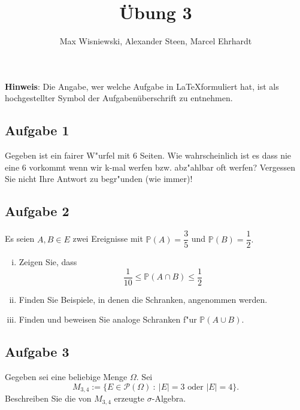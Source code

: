 \documentclass[11pt,a4paper,ngerman]{article}
\date{}
\title{Übung 3}
\author{Max Wisniewski\maxw, Alexander Steen\alex, Marcel Ehrhardt\marcel}
\newcommand{\set}[1]{ \{ #1 \}}
\newcommand{\Prob}{\mathbb{P}}
\newcommand{\Pot}{\mathcal{P}}
\newcommand{\abs}[1]{ |#1|}
\begin{document}

\renewcommand{\figurename}{Figure}

\maketitle
\thispagestyle{fancy}

\begin{center}
\textbf{Hinweis}: Die Angabe, wer welche Aufgabe in \LaTeX formuliert hat, ist als hochgestellter Symbol der Aufgabenüberschrift zu entnehmen.
\end{center}


\subsection*{Aufgabe 1}
Gegeben ist ein fairer W"urfel mit 6 Seiten. Wie wahrscheinlich ist es dass nie eine
6 vorkommt wenn wir k-mal werfen bzw. abz"ahlbar oft werfen? Vergessen Sie nicht
Ihre Antwort zu begr"unden (wie immer)!

\subsection*{Aufgabe 2}
Es seien $A, B \in E$ zwei Ereignisse mit $\Prob(A) = \dfrac{3}{5}$ und $\Prob(B) = \dfrac{1}{2}.$

\begin{enumerate}[(i)]
  \item Zeigen Sie, dass \[\dfrac{1}{10} \le \Prob(A \cap B) \le \dfrac{1}{2}\]
  \item Finden Sie Beispiele, in denen die Schranken, angenommen werden.
  \item Finden und beweisen Sie analoge Schranken f"ur $\Prob(A \cup B)$.
\end{enumerate}

\subsection*{Aufgabe 3}

\newcommand{\SetM}{M_{3,4}}

Gegeben sei eine beliebige Menge $\Omega$. Sei \[
  \SetM := \set{E \in \Pot(\Omega)\ :\ \abs{E} = 3 \mbox{ oder } \abs{E} = 4}.
\]
Beschreiben Sie die von $\SetM$ erzeugte $\sigma$-Algebra.\\
\end{document}

